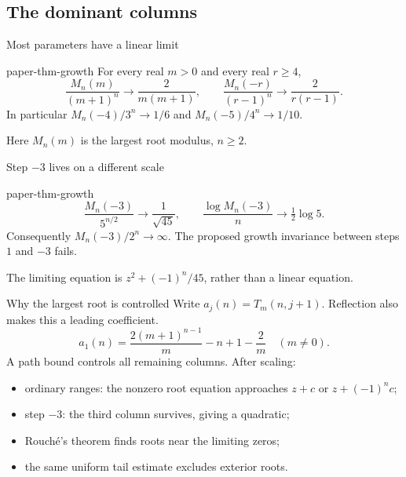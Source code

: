 \documentclass{beamer}
\begin{document}
\subsection{The dominant columns}
\begin{frame}{Most parameters have a linear limit}
\begin{bookresult}{paper-thm-growth}
For every real $m>0$ and every real $r\geq4$,
\[
\frac{M_n(m)}{(m+1)^n}\longrightarrow\frac2{m(m+1)},
\qquad
\frac{M_n(-r)}{(r-1)^n}\longrightarrow\frac2{r(r-1)}.
\]
In particular $M_n(-4)/3^n\to1/6$ and $M_n(-5)/4^n\to1/10$.
\end{bookresult}
Here $M_n(m)$ is the largest root modulus, $n\geq2$.
\end{frame}
\begin{frame}{Step $-3$ lives on a different scale}
\begin{bookresult}{paper-thm-growth}
\[
\frac{M_n(-3)}{5^{n/2}}\longrightarrow\frac1{\sqrt{45}},
\qquad
\frac{\log M_n(-3)}n\longrightarrow\tfrac12\log5.
\]
Consequently $M_n(-3)/2^n\to\infty$.
The proposed growth invariance between steps $1$ and $-3$ fails.
\end{bookresult}
The limiting equation is $z^2+(-1)^n/45$, rather than a linear equation.
\end{frame}
\begin{frame}{Why the largest root is controlled}
Write $a_j(n)=T_m(n,j+1)$. Reflection also makes this a leading coefficient.
\[
a_1(n)=\frac{2(m+1)^{n-1}}m-n+1-\frac2m\quad(m\ne0).
\]
A path bound controls all remaining columns. After scaling:
\begin{itemize}
\item ordinary ranges: the nonzero root equation approaches $z+c$ or $z+(-1)^nc$;
\item step $-3$: the third column survives, giving a quadratic;
\item Rouch\'e's theorem finds roots near the limiting zeros;
\item the same uniform tail estimate excludes exterior roots.
\end{itemize}
\end{frame}
\end{document}
